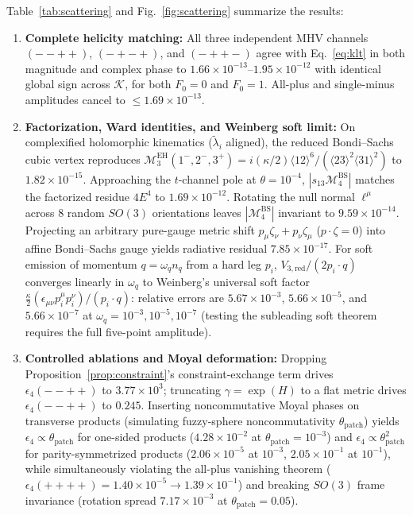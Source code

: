 \documentclass[11pt]{article}
\newcommand{\calK}{\mathcal{K}}
\newcommand{\calM}{\mathcal{M}}
\begin{document}
Table~\ref{tab:scattering} and Fig.~\ref{fig:scattering} summarize the results:
\begin{enumerate}
\item \textbf{Complete helicity matching:} All three independent MHV channels $(--++)$, $(-+-+)$, and $(-++-)$ agree with Eq.~\eqref{eq:klt} in both magnitude and complex phase to $1.66\times 10^{-13}\text{--}1.95\times 10^{-12}$ with identical global sign across $\calK$, for both $F_0=0$ and $F_0=1$. All-plus and single-minus amplitudes cancel to $\le 1.69\times 10^{-13}$.
\item \textbf{Factorization, Ward identities, and Weinberg soft limit:} On complexified holomorphic kinematics ($\tilde\lambda_i$ aligned), the reduced Bondi--Sachs cubic vertex reproduces $\calM_3^{\mathrm{EH}}(1^-,2^-,3^+) = i(\kappa/2)\langle 12\rangle^6/(\langle 23\rangle^2\langle 31\rangle^2)$ to $1.82\times 10^{-15}$. Approaching the $t$-channel pole at $\theta = 10^{-4}$, $|s_{13}\calM_4^{\mathrm{BS}}|$ matches the factorized residue $4E^4$ to $1.69\times 10^{-12}$. Rotating the null normal $\ell^\mu$ across 8 random $SO(3)$ orientations leaves $|\calM_4^{\mathrm{BS}}|$ invariant to $9.59\times 10^{-14}$. Projecting an arbitrary pure-gauge metric shift $p_\mu\zeta_\nu + p_\nu\zeta_\mu$ ($p\cdot\zeta = 0$) into affine Bondi--Sachs gauge yields radiative residual $7.85\times 10^{-17}$. For soft emission of momentum $q = \omega_q n_q$ from a hard leg $p_i$, $V_{3,\mathrm{red}}/(2p_i\cdot q)$ converges linearly in $\omega_q$ to Weinberg's universal soft factor~\cite{Weinberg1964} $\frac{\kappa}{2}(\epsilon_{\mu\nu}p_i^\mu p_i^\nu)/(p_i\cdot q)$: relative errors are $5.67\times 10^{-3}$, $5.66\times 10^{-5}$, and $5.66\times 10^{-7}$ at $\omega_q = 10^{-3}, 10^{-5}, 10^{-7}$ (testing the subleading soft theorem~\cite{CachazoStrominger2014} requires the full five-point amplitude).
\item \textbf{Controlled ablations and Moyal deformation:} Dropping Proposition~\ref{prop:constraint}'s constraint-exchange term drives $\epsilon_4(--++)$ to $3.77\times 10^3$; truncating $\gamma = \exp(H)$ to a flat metric drives $\epsilon_4(--++)$ to $0.245$. Inserting noncommutative Moyal phases on transverse products (simulating fuzzy-sphere noncommutativity $\theta_{\mathrm{patch}}$) yields $\epsilon_4 \propto \theta_{\mathrm{patch}}$ for one-sided products ($4.28\times 10^{-2}$ at $\theta_{\mathrm{patch}}=10^{-3}$) and $\epsilon_4 \propto \theta_{\mathrm{patch}}^2$ for parity-symmetrized products ($2.06\times 10^{-5}$ at $10^{-3}$, $2.05\times 10^{-1}$ at $10^{-1}$), while simultaneously violating the all-plus vanishing theorem ($\epsilon_4(++++) = 1.40\times 10^{-5} \to 1.39\times 10^{-1}$) and breaking $SO(3)$ frame invariance (rotation spread $7.17\times 10^{-3}$ at $\theta_{\mathrm{patch}}=0.05$).
\end{enumerate}
\end{document}
